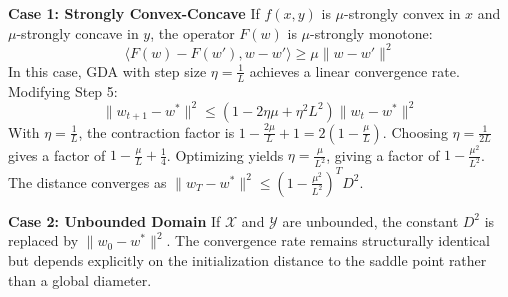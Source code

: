 \documentclass{article}
\begin{document}
\textbf{Case 1: Strongly Convex-Concave}
If $f(x,y)$ is $\mu$-strongly convex in $x$ and $\mu$-strongly concave in $y$, the operator $F(w)$ is $\mu$-strongly monotone:
$$ \langle F(w) - F(w'), w - w' \rangle \geq \mu \|w - w'\|^2 $$
In this case, GDA with step size $\eta = \frac{1}{L}$ achieves a linear convergence rate. Modifying Step 5:
$$ \|w_{t+1} - w^*\|^2 \leq (1 - 2\eta\mu + \eta^2 L^2) \|w_t - w^*\|^2 $$
With $\eta = \frac{1}{L}$, the contraction factor is $1 - \frac{2\mu}{L} + 1 = 2(1 - \frac{\mu}{L})$. Choosing $\eta = \frac{1}{2L}$ gives a factor of $1 - \frac{\mu}{L} + \frac{1}{4}$. Optimizing yields $\eta = \frac{\mu}{L^2}$, giving a factor of $1 - \frac{\mu^2}{L^2}$. The distance converges as $\|w_T - w^*\|^2 \leq \left(1 - \frac{\mu^2}{L^2}\right)^T D^2$.

\textbf{Case 2: Unbounded Domain}
If $\mathcal{X}$ and $\mathcal{Y}$ are unbounded, the constant $D^2$ is replaced by $\|w_0 - w^*\|^2$. The convergence rate remains structurally identical but depends explicitly on the initialization distance to the saddle point rather than a global diameter.
\end{document}
